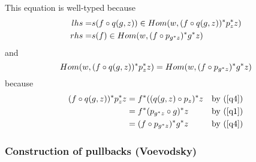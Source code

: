 \documentclass[10pt,a4paper]{scrartcl}
\begin{document}
\noindent
This equation is well-typed because
\begin{align*}
      lhs = &s(f \circ q(g,z)) \in Hom(w,(f \circ q(g,z) ) ^* p_z ^* z ) \\
      rhs = &s(f) \in Hom(w,(f \circ   p_{g ^* z} ) ^*  g ^* z  )\\
\end{align*}
and
\begin{equation*}
     Hom(w,(f \circ q(g,z) ) ^* p_z ^* z ) = Hom(w,(f \circ   p_{g ^* z} ) ^*  g ^* z )
\end{equation*}
because
\begin{align*}
(f \circ q(g,z) ) ^* p_z ^* z 
                 & = f ^* ((q(g,z) \circ p_z) ^* z &\mbox{by (\ref{q4})}\\
                 & = f ^* ( p_{g ^* z} \circ g ) ^* z&\mbox{by (\ref{q1})}\\
                 & = (f \circ   p_{g ^* z} ) ^*  g ^* z&\mbox{by (\ref{q4})}
\end{align*}

\subsubsection{Construction of pullbacks (Voevodsky)}
\end{document}
